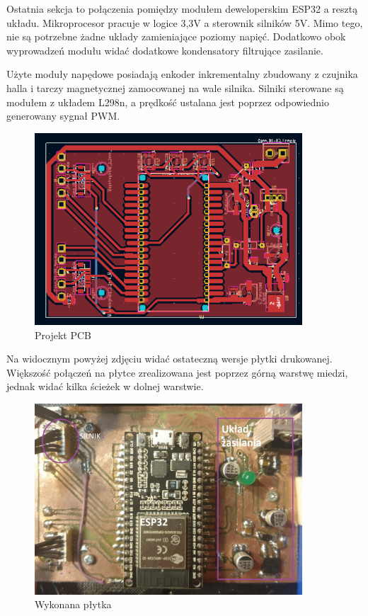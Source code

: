 Ostatnia sekcja to połączenia pomiędzy modułem deweloperskim ESP32 a resztą układu. Mikroprocesor pracuje w logice 3,3V a sterownik silników 5V. 
Mimo tego, nie są potrzebne żadne układy zamieniające poziomy napięć. 
Dodatkowo obok wyprowadzeń modułu widać dodatkowe kondensatory filtrujące zasilanie. 
 
Użyte moduły napędowe posiadają enkoder inkrementalny zbudowany z czujnika halla i tarczy magnetycznej zamocowanej na wale silnika.
Silniki sterowane są modułem z układem L298n, a prędkość ustalana jest poprzez odpowiednio generowany sygnał PWM.
\begin{figure}[H]
	\centering
	\includegraphics[width=10cm]{pages/robot/zdjecia/kicad/kiCad_PCB.png}
	\caption{Projekt PCB}
	\label{Fig:kiCadPCB}
\end{figure}

Na widocznym powyżej zdjęciu widać ostateczną wersje płytki drukowanej. Większość połączeń na płytce zrealizowana jest poprzez górną warstwę miedzi,
jednak widać kilka ścieżek w dolnej warstwie.

\begin{figure}[H]
	\centering
	\includegraphics[width=10cm]{pages/robot/zdjecia/wykonanePCB.jpg}
	\caption{Wykonana płytka}
	\label{Fig:wykonanePCB}
\end{figure}

